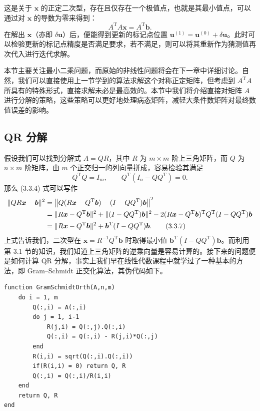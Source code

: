 这是关于 $\bm x$ 的正定二次型，存在且仅存在一个极值点，也就是其最小值点，可以通过对 $\bm x$ 的导数为零来得到：
\begin{equation}
A^{\mathrm T}A\bm x=A^{\mathrm T}\bm b.
\tag{3.3.5}
\end{equation}
在解出 $\bm x$（亦即 $\delta\bm u$）后，便能得到更新的标记点位置 $\bm u^{(1)}=\bm u^{(0)}+\delta\bm u$。此时可以检验更新的标记点精度是否满足要求，若不满足，则可以将其重新作为猜测值再次代入进行迭代求解。

本节主要关注最小二乘问题，而原始的非线性问题将会在下一章中详细讨论。自然，我们可以直接使用上一节学到的算法求解这个对称正定矩阵，但考虑到 $A^{\mathrm T}A$ 所具有的特殊形式，直接求解未必是最高效的。本节中我们将介绍直接对矩阵 $A$ 进行分解的策略，这些策略可以更好地处理病态矩阵，减轻大条件数矩阵对最终数值误差的影响。

\subsection{QR 分解}

假设我们可以找到分解式 $A=QR$，其中 $R$ 为 $m\times m$ 阶上三角矩阵，而 $Q$ 为 $n\times m$ 阶矩阵，由 $m$ 个正交归一的列向量拼成，容易检验其满足
\begin{equation}
Q^{\mathrm T}Q=I_m,
\qquad
Q^{\mathrm T}(I_n-QQ^{\mathrm T})=0.
\tag{3.3.6}
\end{equation}
那么 (3.3.4) 式可以写作
\begin{align}
\lVert QR\bm x-\bm b\rVert^2
&=\left\lVert Q(R\bm x-Q^{\mathrm T}\bm b)-(I-QQ^{\mathrm T})\bm b\right\rVert^2\notag\\
&=\lVert R\bm x-Q^{\mathrm T}\bm b\rVert^2
 +\lVert(I-QQ^{\mathrm T})\bm b\rVert^2
 -2(R\bm x-Q^{\mathrm T}\bm b)^{\mathrm T}Q^{\mathrm T}(I-QQ^{\mathrm T})\bm b\notag\\
&=\lVert R\bm x-Q^{\mathrm T}\bm b\rVert^2
 +\bm b^{\mathrm T}(I-QQ^{\mathrm T})\bm b.
\tag{3.3.7}
\end{align}
上式告诉我们，二次型在 $\bm x=R^{-1}Q^{\mathrm T}\bm b$ 时取得最小值 $\bm b^{\mathrm T}(I-QQ^{\mathrm T})\bm b$。而利用第 3.1 节的知识，我们知道上三角矩阵的逆乘向量是容易计算的。接下来的问题便是如何计算 QR 分解，事实上我们早在线性代数课程中就学过了一种基本的方法，即 Gram--Schmidt 正交化算法，其伪代码如下。

\begin{algorithmBox}
\begin{lstlisting}[style=bellacode]
function GramSchmidtOrth(A,n,m)
    do i = 1, m
        Q(:,i) = A(:,i)
        do j = 1, i-1
            R(j,i) = Q(:,j).Q(:,i)
            Q(:,i) = Q(:,i) - R(j,i)*Q(:,j)
        end
        R(i,i) = sqrt(Q(:,i).Q(:,i))
        if(R(i,i) = 0) return Q, R
        Q(:,i) = Q(:,i)/R(i,i)
    end
    return Q, R
end
\end{lstlisting}
\end{algorithmBox}

